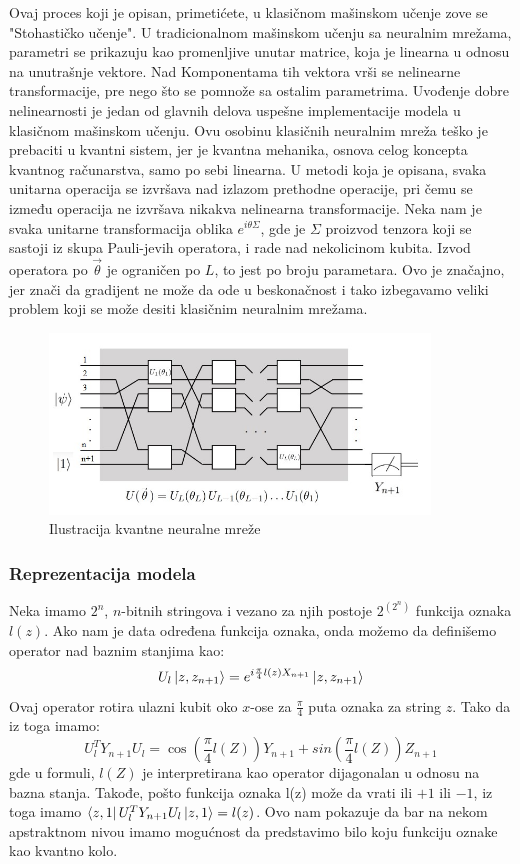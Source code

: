 \documentclass[12pt, letterpaper, oneside]{article}
\begin{document}
Ovaj proces koji je opisan, primetićete, u klasičnom mašinskom učenje zove se "Stohastičko učenje".
U tradicionalnom mašinskom učenju sa neuralnim mrežama, parametri se prikazuju kao promenljive unutar matrice, koja je linearna u odnosu na unutrašnje vektore.
Nad Komponentama tih vektora vrši se nelinearne transformacije, pre nego što se pomnože sa ostalim parametrima. 
Uvođenje dobre nelinearnosti je jedan od glavnih delova uspešne implementacije modela u klasičnom mašinskom učenju.
Ovu osobinu klasičnih neuralnim mreža teško je prebaciti u kvantni sistem, jer je kvantna mehanika, osnova celog koncepta kvantnog računarstva, samo po sebi linearna.
U metodi koja je opisana, svaka unitarna operacija se izvršava nad izlazom prethodne operacije, pri čemu se između operacija ne izvršava nikakva nelinearna transformacije.
Neka nam je svaka unitarne transformacija oblika $e^{i\theta\Sigma}$, gde je $\Sigma$ proizvod tenzora koji se sastoji iz skupa Pauli-jevih operatora, i rade nad nekolicinom kubita.
Izvod operatora po $\overrightarrow{\theta}$ je ograničen po $L$, to jest po broju parametara. Ovo je značajno, jer znači da gradijent ne može da ode u beskonačnost i tako izbegavamo 
veliki problem koji se može desiti klasičnim neuralnim mrežama.

\begin{figure}[ht]
    \centering
    \includegraphics[width=0.9\textwidth]{files/QNN.jpg}
    \caption{Ilustracija kvantne neuralne mreže \cite{Classification_wit_QNN}}
\end{figure}

\subsubsection{Reprezentacija modela}
Neka imamo $2^n$, $n$-bitnih stringova i vezano za njih postoje $2^{(2^n)}$ funkcija oznaka $l(z)$.
Ako nam je data određena funkcija oznaka, onda možemo da definišemo operator nad baznim stanjima kao:
\[
    U_l\Ket{z,z_{n+1}} = e^{i\frac{\pi}{4}l(z)X_{n+1}}\Ket{z,z_{n+1}}
\]
Ovaj operator rotira ulazni kubit oko $x$-ose za $\frac{\pi}{4}$ puta oznaka za string $z$.
Tako da iz toga imamo:
\[
    U_l^TY_{n+1}U_l = \cos(\frac{\pi}{4}l(Z))Y_{n+1} + sin(\frac{\pi}{4}l(Z))Z_{n+1}
\]
gde u formuli, $l(Z)$ je interpretirana kao operator dijagonalan u odnosu na bazna stanja.
Takođe, pošto funkcija oznaka l(z) može da vrati ili $+1$ ili $-1$, iz toga imamo $\bra{z,1}U_l^TY_{n+1}U_l\ket{z,1} = l(z)$.
Ovo nam pokazuje da bar na nekom apstraktnom nivou imamo mogućnost da predstavimo bilo koju funkciju oznake kao kvantno kolo.
\end{document}
